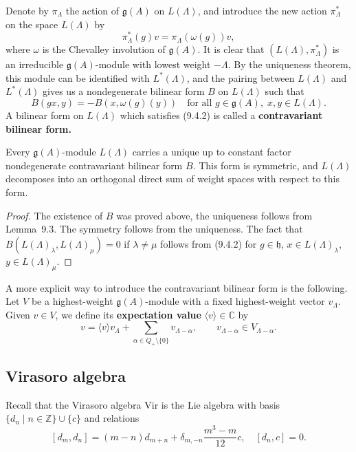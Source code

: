 \documentclass[12pt]{article}
\begin{document}
Denote by $\pi_\Lambda$ the action of $\mathfrak{g}(A)$ on $L(\Lambda)$, and introduce
the new action $\pi_\Lambda^*$ on the space $L(\Lambda)$ by
\begin{equation}
    \pi_\Lambda^*(g)v = \pi_\Lambda(\omega(g))v,
    \tag{9.4.1}
\end{equation}
where $\omega$ is the Chevalley involution of $\mathfrak{g}(A)$.
It is clear that $(L(\Lambda), \pi_\Lambda^*)$ is an irreducible
$\mathfrak{g}(A)$-module with lowest weight $-\Lambda$.
By the uniqueness theorem, this module can be identified with $L^*(\Lambda)$,
and the pairing between $L(\Lambda)$ and $L^*(\Lambda)$ gives us a nondegenerate
bilinear form $B$ on $L(\Lambda)$ such that
\begin{equation}
    B(gx, y) = -B(x, \omega(g)(y))
    \quad
    \text{for all } g \in \mathfrak{g}(A),\; x,y \in L(\Lambda).
    \tag{9.4.2}
\end{equation}
A bilinear form on $L(\Lambda)$ which satisfies (9.4.2) is called a
\textbf{contravariant bilinear form.}

\begin{proposition}[9.4]
    Every $\mathfrak{g}(A)$-module $L(\Lambda)$ carries a unique up to constant factor
    nondegenerate contravariant bilinear form $B$. This form is symmetric, and
    $L(\Lambda)$ decomposes into an orthogonal direct sum of weight spaces with respect to
    this form.
\end{proposition}

\begin{proof}
    The existence of $B$ was proved above, the uniqueness follows from Lemma~9.3.
    The symmetry follows from the uniqueness. The fact that
    $B(L(\Lambda)_\lambda, L(\Lambda)_\mu) = 0$ if $\lambda \neq \mu$
    follows from (9.4.2) for $g \in \mathfrak{h}$, $x \in L(\Lambda)_\lambda$,
    $y \in L(\Lambda)_\mu$.
\end{proof}

A more explicit way to introduce the contravariant bilinear form is the following.
Let $V$ be a highest-weight $\mathfrak{g}(A)$-module with a fixed highest-weight
vector $v_\Lambda$. Given $v \in V$, we define its \textbf{expectation value}
$\langle v \rangle \in \mathbb{C}$ by
\[
    v = \langle v \rangle v_\Lambda + \sum_{\alpha \in Q_+ \setminus \{0\}} v_{\Lambda - \alpha},
    \qquad
    v_{\Lambda - \alpha} \in V_{\Lambda - \alpha}.
\]
\subsection{Virasoro algebra}
Recall that the Virasoro algebra $\mathrm{Vir}$ is the Lie algebra with basis
$\{d_n \mid n \in \mathbb{Z}\} \cup \{c\}$ and relations
\[[d_m, d_n] = (m-n)d_{m+n} + \delta_{m,-n} \frac{m^3 - m}{12} c, \quad [d_n, c] = 0.\]
\end{document}
